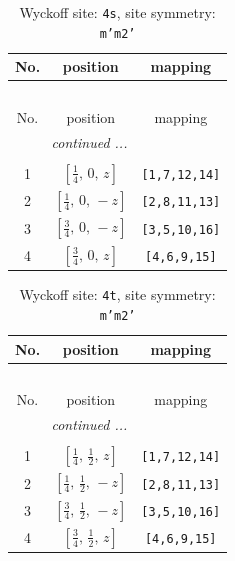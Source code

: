 \documentclass[fleqn,8pt]{jsarticle}
\begin{document}
\renewcommand{\arraystretch}{1.2}
\begin{longtable}{ccc}
\caption{Wyckoff site: {\tt 4s}, site symmetry: {\tt m'm2'}}
 \\
 \hline \hline
No. & position & mapping \\ \hline \endfirsthead

\multicolumn{2}{l}{\tablename\ \thetable{}} \\
 \hline \hline
No. & position & mapping \\ \hline \endhead

 \hline \hline
\multicolumn{2}{r}{\footnotesize\it continued ...} \\ \endfoot

 \hline \hline
\multicolumn{2}{r}{} \\ \endlastfoot

1 & $\left[ \frac{1}{4},\, 0,\, z \right]$ & {\tt [1,7,12,14]} \\ \hline
2 & $\left[ \frac{1}{4},\, 0,\, - z \right]$ & {\tt [2,8,11,13]} \\ \hline
3 & $\left[ \frac{3}{4},\, 0,\, - z \right]$ & {\tt [3,5,10,16]} \\ \hline
4 & $\left[ \frac{3}{4},\, 0,\, z \right]$ & {\tt [4,6,9,15]} \\
\end{longtable}
\renewcommand{\arraystretch}{1.2}
\begin{longtable}{ccc}
\caption{Wyckoff site: {\tt 4t}, site symmetry: {\tt m'm2'}}
 \\
 \hline \hline
No. & position & mapping \\ \hline \endfirsthead

\multicolumn{2}{l}{\tablename\ \thetable{}} \\
 \hline \hline
No. & position & mapping \\ \hline \endhead

 \hline \hline
\multicolumn{2}{r}{\footnotesize\it continued ...} \\ \endfoot

 \hline \hline
\multicolumn{2}{r}{} \\ \endlastfoot

1 & $\left[ \frac{1}{4},\, \frac{1}{2},\, z \right]$ & {\tt [1,7,12,14]} \\ \hline
2 & $\left[ \frac{1}{4},\, \frac{1}{2},\, - z \right]$ & {\tt [2,8,11,13]} \\ \hline
3 & $\left[ \frac{3}{4},\, \frac{1}{2},\, - z \right]$ & {\tt [3,5,10,16]} \\ \hline
4 & $\left[ \frac{3}{4},\, \frac{1}{2},\, z \right]$ & {\tt [4,6,9,15]} \\
\end{longtable}
\end{document}
